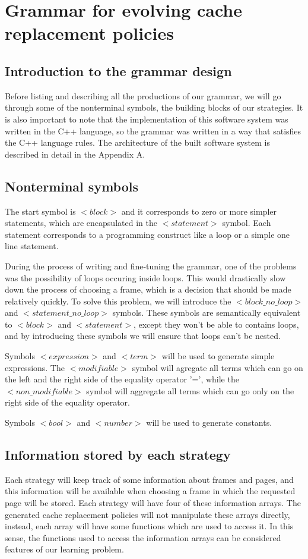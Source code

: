 \section{Grammar for evolving cache replacement policies}
\subsection{Introduction to the grammar design}
Before listing and describing all the productions of our grammar, we will go through some of the nonterminal symbols, the building blocks of our strategies. It is also important to note that the implementation of this software system was written in the C++ language, so the grammar was written in a way that satisfies the C++ language rules. The architecture of the built software system is described in detail in the Appendix A.

\subsection{Nonterminal symbols}
The start symbol is ${<}block{>}$ and it corresponds to zero or more simpler statements, which are encapsulated in the ${<}statement{>}$ symbol. Each statement corresponds to a programming construct like a loop or a simple one line statement.

During the process of writing and fine-tuning the grammar, one of the problems was the possibility of loops occuring inside loops. This would drastically slow down the process of choosing a frame, which is a decision that should be made relatively quickly. To solve this problem, we will introduce the ${<}block\_no\_loop{>}$ and ${<}statement\_no\_loop{>}$ symbols. These symbols are semantically equivalent to ${<}block{>}$ and ${<}statement{>}$, except they won't be able to contains loops, and by introducing these symbols we will ensure that loops can't be nested.

Symbols ${<}expression{>}$ and ${<}term{>}$ will be used to generate simple expressions. The ${<}modifiable{>}$ symbol	 will agregate all terms which can go on the left and the right side of the equality operator '=', while the ${<}non\_modifiable{>}$ symbol will aggregate all terms which can go only on the right side of the equality operator.

Symbols ${<}bool{>}$ and ${<}number{>}$ will be used to generate constants.

\subsection{Information stored by each strategy}
Each strategy will keep track of some information about frames and pages, and this information will be available when choosing a frame in which the requested page will be stored. Each strategy will have four of these information arrays. The generated cache replacement policies will not manipulate these arrays directly, instead, each array will have some functions which are used to access it. In this sense, the functions used to access the information arrays can be considered features of our learning problem.

